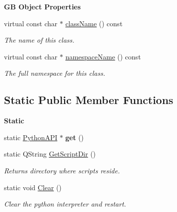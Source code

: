 \begin{Indent}\textbf{ GB Object Properties}\par
\begin{DoxyCompactItemize}
\item 
virtual const char $\ast$ \mbox{\hyperlink{classrev_1_1_python_a_p_i_ab8d7ecd519d9d930bc7024a9e222218e}{class\+Name}} () const
\begin{DoxyCompactList}\small\item\em The name of this class. \end{DoxyCompactList}\item 
virtual const char $\ast$ \mbox{\hyperlink{classrev_1_1_python_a_p_i_ae8df4c3f4f00912cd2c184d79bfb31da}{namespace\+Name}} () const
\begin{DoxyCompactList}\small\item\em The full namespace for this class. \end{DoxyCompactList}\end{DoxyCompactItemize}
\end{Indent}
\subsection*{Static Public Member Functions}
\begin{Indent}\textbf{ Static}\par
\begin{DoxyCompactItemize}
\item 
\mbox{\label{classrev_1_1_python_a_p_i_a53508f85369f93af3b18275a68a655c7}} 
static \mbox{\hyperlink{classrev_1_1_python_a_p_i}{Python\+A\+PI}} $\ast$ {\bfseries get} ()
\item 
\mbox{\label{classrev_1_1_python_a_p_i_ab2b59c4df57ecd84ba944cf44f68cab1}} 
static Q\+String \mbox{\hyperlink{classrev_1_1_python_a_p_i_ab2b59c4df57ecd84ba944cf44f68cab1}{Get\+Script\+Dir}} ()
\begin{DoxyCompactList}\small\item\em Returns directory where scripts reside. \end{DoxyCompactList}\item 
\mbox{\label{classrev_1_1_python_a_p_i_a98ae4fa6bcd9a989c958d40dba277a79}} 
static void \mbox{\hyperlink{classrev_1_1_python_a_p_i_a98ae4fa6bcd9a989c958d40dba277a79}{Clear}} ()
\begin{DoxyCompactList}\small\item\em Clear the python interpreter and restart. \end{DoxyCompactList}\end{DoxyCompactItemize}
\end{Indent}
